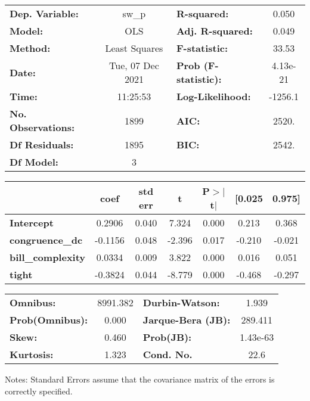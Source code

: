 \begin{center}
\begin{tabular}{lclc}
\toprule
\textbf{Dep. Variable:}    &      sw\_p       & \textbf{  R-squared:         } &     0.050   \\
\textbf{Model:}            &       OLS        & \textbf{  Adj. R-squared:    } &     0.049   \\
\textbf{Method:}           &  Least Squares   & \textbf{  F-statistic:       } &     33.53   \\
\textbf{Date:}             & Tue, 07 Dec 2021 & \textbf{  Prob (F-statistic):} &  4.13e-21   \\
\textbf{Time:}             &     11:25:53     & \textbf{  Log-Likelihood:    } &   -1256.1   \\
\textbf{No. Observations:} &        1899      & \textbf{  AIC:               } &     2520.   \\
\textbf{Df Residuals:}     &        1895      & \textbf{  BIC:               } &     2542.   \\
\textbf{Df Model:}         &           3      & \textbf{                     } &             \\
\bottomrule
\end{tabular}
\begin{tabular}{lcccccc}
                          & \textbf{coef} & \textbf{std err} & \textbf{t} & \textbf{P$> |$t$|$} & \textbf{[0.025} & \textbf{0.975]}  \\
\midrule
\textbf{Intercept}        &       0.2906  &        0.040     &     7.324  &         0.000        &        0.213    &        0.368     \\
\textbf{congruence\_dc}   &      -0.1156  &        0.048     &    -2.396  &         0.017        &       -0.210    &       -0.021     \\
\textbf{bill\_complexity} &       0.0334  &        0.009     &     3.822  &         0.000        &        0.016    &        0.051     \\
\textbf{tight}            &      -0.3824  &        0.044     &    -8.779  &         0.000        &       -0.468    &       -0.297     \\
\bottomrule
\end{tabular}
\begin{tabular}{lclc}
\textbf{Omnibus:}       & 8991.382 & \textbf{  Durbin-Watson:     } &    1.939  \\
\textbf{Prob(Omnibus):} &   0.000  & \textbf{  Jarque-Bera (JB):  } &  289.411  \\
\textbf{Skew:}          &   0.460  & \textbf{  Prob(JB):          } & 1.43e-63  \\
\textbf{Kurtosis:}      &   1.323  & \textbf{  Cond. No.          } &     22.6  \\
\bottomrule
\end{tabular}
\end{center}

Notes: \newline
 [1] Standard Errors assume that the covariance matrix of the errors is correctly specified.